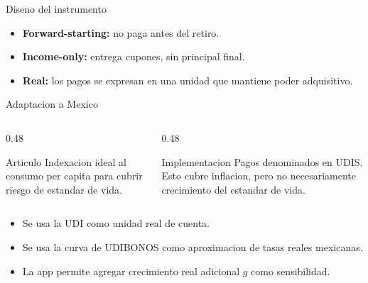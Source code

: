 \documentclass[aspectratio=169,11pt]{beamer}
\newcommand{\udis}{\textsc{UDIS}}
\begin{document}
\begin{frame}{Diseno del instrumento}
  \begin{center}
  \end{center}
  \begin{itemize}
    \item \textbf{Forward-starting:} no paga antes del retiro.
    \item \textbf{Income-only:} entrega cupones, sin principal final.
    \item \textbf{Real:} los pagos se expresan en una unidad que mantiene poder adquisitivo.
  \end{itemize}
\end{frame}

\begin{frame}{Adaptacion a Mexico}
  \begin{columns}[T]
    \begin{column}{0.48\textwidth}
      \begin{block}{Articulo}
        Indexacion ideal al consumo per capita para cubrir riesgo de estandar de vida.
      \end{block}
    \end{column}
    \begin{column}{0.48\textwidth}
      \begin{block}{Implementacion}
        Pagos denominados en \udis. Esto cubre inflacion, pero no necesariamente crecimiento del estandar de vida.
      \end{block}
    \end{column}
  \end{columns}
  \vspace{0.45cm}
  \begin{itemize}
    \item Se usa la UDI como unidad real de cuenta.
    \item Se usa la curva de UDIBONOS como aproximacion de tasas reales mexicanas.
    \item La app permite agregar crecimiento real adicional $g$ como sensibilidad.
  \end{itemize}
\end{frame}
\end{document}
